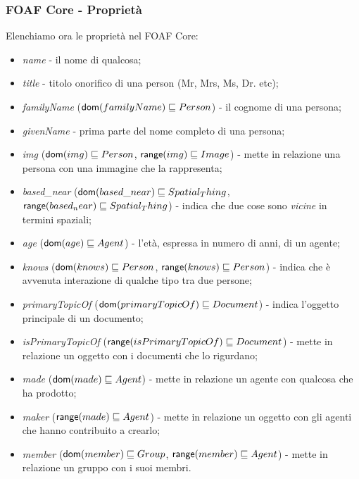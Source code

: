 \documentclass[8pt]{beamer}
\begin{document}
\begin{frame}
  \frametitle{FOAF Core - Propriet\`a}
  Elenchiamo ora le propriet\`a nel FOAF Core:
  
  \begin{itemize}
   \item \emph{name} - il nome di qualcosa;
   \item \emph{title} - titolo onorifico di una person (Mr, Mrs, Ms, Dr. etc);
   \item \emph{familyName} ($\mathsf{dom}(familyName) \sqsubseteq Person$) - il cognome di una persona;
   \item \emph{givenName} - prima parte del nome completo di una persona;
   \item \emph{img} ($\mathsf{dom}(img) \sqsubseteq Person$, $\mathsf{range}(img) \sqsubseteq Image$) - mette in relazione una persona con 
   una immagine che la rappresenta;
   \item \emph{based\_near} ($\mathsf{dom}(based\_near) \sqsubseteq Spatial_Thing$, $\mathsf{range}(based_near) \sqsubseteq Spatial_Thing$) - 
    indica che due cose sono \emph{vicine} in termini spaziali;
   \item \emph{age} ($\mathsf{dom}(age) \sqsubseteq Agent$) - l'et\`a, espressa in numero di anni, di un agente;    
   \item \emph{knows} ($\mathsf{dom}(knows) \sqsubseteq Person$, $\mathsf{range}(knows) \sqsubseteq Person$) - indica che \`e avvenuta interazione
   di qualche tipo tra due persone;
   \item \emph{primaryTopicOf} ($\mathsf{dom}(primaryTopicOf) \sqsubseteq Document$) - indica l'oggetto principale di un documento;
   \item \emph{isPrimaryTopicOf} ($\mathsf{range}(isPrimaryTopicOf) \sqsubseteq Document$) - mette in relazione un oggetto con i 
    documenti che lo rigurdano;
   \item \emph{made} ($\mathsf{dom}(made) \sqsubseteq Agent$) - mette in relazione un agente con qualcosa 
   che ha prodotto;
   \item \emph{maker} ($\mathsf{range}(made) \sqsubseteq Agent$) - mette in relazione un oggetto con gli agenti
   che hanno contribuito a crearlo; 
   \item \emph{member} ($\mathsf{dom}(member) \sqsubseteq Group$, $\mathsf{range}(member) \sqsubseteq Agent$) - mette in relazione un
   gruppo con i suoi membri.
  \end{itemize}
\end{frame}
\end{document}
